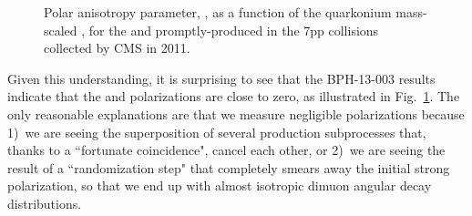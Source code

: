 \begin{figure}[h]
\centering
{}
\caption{Polar anisotropy parameter, \lth, as a function of the quarkonium 
mass-scaled \pt, for the \jpsi and \psip promptly-produced in the
7\TeV pp collisions collected by CMS in 2011.}
\label{fig:BPH13003}
\end{figure}

Given this understanding, it is surprising to see that the BPH-13-003
results indicate that the \jpsi and \psip polarizations are close to zero, 
as illustrated in Fig.~\ref{fig:BPH13003}.
The only reasonable explanations are that we measure negligible polarizations 
because 1)~we are seeing the superposition of
several production subprocesses that, thanks to a ``fortunate coincidence", 
cancel each other, or 2)~we are seeing the result of a ``randomization step" that
completely smears away the initial strong polarization, so that we end up with 
almost isotropic dimuon angular decay distributions.

